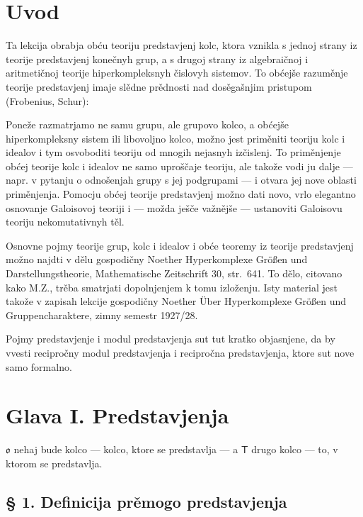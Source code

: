 \documentclass[11pt]{article}
\newcommand{\foreign}[1]{#1}
\begin{document}
\clearpage
\section*{Uvod}\label{einleitung}

Ta lekcija obrabja obću teoriju predstavjenj kolc, ktora vznikla s
jednoj strany iz teorije predstavjenj konečnyh grup, a s drugoj strany
iz algebraičnoj i aritmetičnoj teorije hiperkompleksnyh čislovyh
sistemov. To obćejše razuměnje teorije predstavjenj imaje slědne
prědnosti nad dosěgašnjim pristupom (\foreign{Frobenius},
\foreign{Schur}):

Poneže razmatrjamo ne samu grupu, ale grupovo kolco, a obćejše
hiperkompleksny sistem ili libovoljno kolco, možno jest priměniti
teoriju kolc i idealov i tym osvoboditi teoriju od mnogih nejasnyh
izčislenj. To priměnjenje obćej teorije kolc i idealov ne samo
uproščaje teoriju, ale takože vodi ju dalje --- napr. v pytanju o
odnošenjah grupy s jej podgrupami --- i otvara jej nove oblasti
priměnjenja. Pomocju obćej teorije predstavjenj možno dati novo, vrlo
elegantno osnovanje Galoisovoj teoriji i --- možda ješče važnějše ---
ustanoviti Galoisovu teoriju nekomutativnyh těl.

Osnovne pojmy teorije grup, kolc i idealov i obće teoremy iz teorije
predstavjenj možno najdti v dělu gospodičny \foreign{Noether}
\foreign{Hyperkomplexe Größen und Darstellungstheorie},
\foreign{Mathematische Zeitschrift} 30, str.~641. To dělo, citovano
kako \foreign{M.Z.}, trěba smatrjati dopolnjenjem k tomu izloženju.
Isty material jest takože v zapisah lekcije gospodičny
\foreign{Noether} \foreign{Über Hyperkomplexe Größen und
Gruppencharaktere}, zimny semestr 1927/28.

Pojmy predstavjenje i modul predstavjenja sut tut kratko objasnjene,
da by vvesti recipročny modul predstavjenja i recipročna
predstavjenja, ktore sut nove samo formalno.

\section*{Glava I. Predstavjenja}\label{kapitel-i.-darstellungen}

$\mathfrak{o}$ nehaj bude kolco --- kolco, ktore se predstavlja --- a
$\mathsf T$ drugo kolco --- to, v ktorom se predstavlja.

\subsection*{§ 1. Definicija prěmogo predstavjenja}\label{definition-der-direkten-darstellung}
\end{document}

